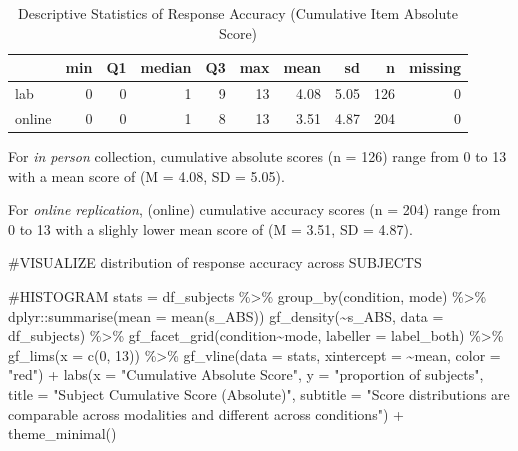 \documentclass[
  letterpaper,
  DIV=11,
  numbers=noendperiod]{scrreprt}
\newenvironment{Shaded}{\begin{snugshade}}{\end{snugshade}}
\newcommand{\AttributeTok}[1]{\textcolor[rgb]{0.40,0.45,0.13}{#1}}
\newcommand{\CommentTok}[1]{\textcolor[rgb]{0.37,0.37,0.37}{#1}}
\newcommand{\DecValTok}[1]{\textcolor[rgb]{0.68,0.00,0.00}{#1}}
\newcommand{\FunctionTok}[1]{\textcolor[rgb]{0.28,0.35,0.67}{#1}}
\newcommand{\NormalTok}[1]{\textcolor[rgb]{0.00,0.23,0.31}{#1}}
\newcommand{\OtherTok}[1]{\textcolor[rgb]{0.00,0.23,0.31}{#1}}
\newcommand{\SpecialCharTok}[1]{\textcolor[rgb]{0.37,0.37,0.37}{#1}}
\newcommand{\StringTok}[1]{\textcolor[rgb]{0.13,0.47,0.30}{#1}}
\begin{document}
\begin{table}

\caption{Descriptive Statistics of Response Accuracy (Cumulative Item Absolute Score)}
\centering
\begin{tabular}[t]{l|r|r|r|r|r|r|r|r|r}
\hline
  & min & Q1 & median & Q3 & max & mean & sd & n & missing\\
\hline
lab & 0 & 0 & 1 & 9 & 13 & 4.08 & 5.05 & 126 & 0\\
\hline
online & 0 & 0 & 1 & 8 & 13 & 3.51 & 4.87 & 204 & 0\\
\hline
\end{tabular}
\end{table}

For \emph{in person} collection, cumulative absolute scores (n = 126)
range from 0 to 13 with a mean score of (M = 4.08, SD = 5.05).

For \emph{online replication}, (online) cumulative accuracy scores (n =
204) range from 0 to 13 with a slighly lower mean score of (M = 3.51, SD
= 4.87).

\begin{Shaded}
\begin{Highlighting}[]
\CommentTok{\#VISUALIZE distribution of response accuracy across SUBJECTS}

\CommentTok{\#HISTOGRAM}
\NormalTok{stats }\OtherTok{=}\NormalTok{ df\_subjects }\SpecialCharTok{\%\textgreater{}\%} \FunctionTok{group\_by}\NormalTok{(condition, mode) }\SpecialCharTok{\%\textgreater{}\%}\NormalTok{ dplyr}\SpecialCharTok{::}\FunctionTok{summarise}\NormalTok{(}\AttributeTok{mean =} \FunctionTok{mean}\NormalTok{(s\_ABS))}
\FunctionTok{gf\_density}\NormalTok{(}\SpecialCharTok{\textasciitilde{}}\NormalTok{s\_ABS, }\AttributeTok{data =}\NormalTok{ df\_subjects) }\SpecialCharTok{\%\textgreater{}\%} 
  \FunctionTok{gf\_facet\_grid}\NormalTok{(condition}\SpecialCharTok{\textasciitilde{}}\NormalTok{mode, }\AttributeTok{labeller =}\NormalTok{ label\_both) }\SpecialCharTok{\%\textgreater{}\%} 
  \FunctionTok{gf\_lims}\NormalTok{(}\AttributeTok{x =} \FunctionTok{c}\NormalTok{(}\DecValTok{0}\NormalTok{, }\DecValTok{13}\NormalTok{)) }\SpecialCharTok{\%\textgreater{}\%} 
  \FunctionTok{gf\_vline}\NormalTok{(}\AttributeTok{data =}\NormalTok{ stats, }\AttributeTok{xintercept =} \SpecialCharTok{\textasciitilde{}}\NormalTok{mean, }\AttributeTok{color =} \StringTok{"red"}\NormalTok{) }\SpecialCharTok{+}
  \FunctionTok{labs}\NormalTok{(}\AttributeTok{x =} \StringTok{"Cumulative Absolute Score"}\NormalTok{,}
       \AttributeTok{y =} \StringTok{"proportion of subjects"}\NormalTok{,}
       \AttributeTok{title =} \StringTok{"Subject Cumulative Score (Absolute)"}\NormalTok{,}
       \AttributeTok{subtitle =} \StringTok{"Score distributions are comparable across modalities and different across conditions"}\NormalTok{) }\SpecialCharTok{+} 
  \FunctionTok{theme\_minimal}\NormalTok{()}
\end{Highlighting}
\end{Shaded}
\end{document}

